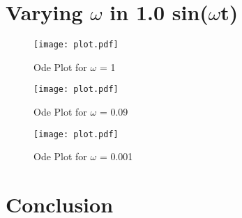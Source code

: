 \documentclass[12pt]{article}
\begin{document}
					
	\section{Varying $\omega$ in 1.0 sin($\omega$t)}
		
		
		
		
			
		\begin{figure}[H]
			\centering
			\texttt{[image: plot.pdf]}
			\caption{Ode Plot for $\omega$ = 1}
			\label{fig:odesininput1}
		\end{figure}
		\begin{figure}[H]
			\centering
			\texttt{[image: plot.pdf]}
			\caption{Ode Plot for $\omega$ = 0.09}
			\label{fig:odesininput009}
		\end{figure}
		\begin{figure}[H]
			\centering
			\texttt{[image: plot.pdf]}
			\caption{Ode Plot for $\omega$ = 0.001}
			\label{fig:odesininput0001}
		\end{figure}		
	\section{Conclusion}
\end{document}
